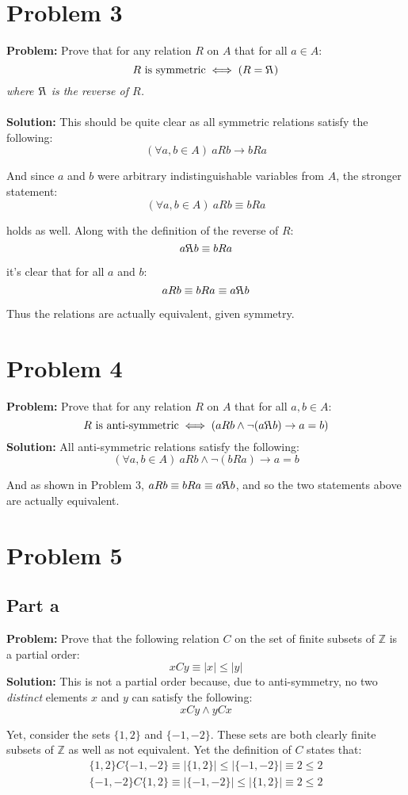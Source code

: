 \documentclass{article}
\DeclareRobustCommand{\revR}{\text{\reflectbox{$R$}}}
\begin{document}
\section*{Problem 3}
\textbf{Problem:} Prove that for any relation $R$ on $A$ that for all $a\in A$:
$$R\text{ is symmetric}\iff(R=\revR)$$
\textit{where $\revR$ is the reverse of $R$.}
\\\\
\textbf{Solution:} This should be quite clear as all symmetric relations satisfy the following:
$$(\forall a,b\in A)\ aRb\rightarrow bRa$$

And since $a$ and $b$ were arbitrary indistinguishable variables from $A$, the stronger statement:
$$(\forall a,b\in A)\ aRb\equiv bRa$$

holds as well. Along with the definition of the reverse of $R$:
$$a\revR b\equiv bRa$$

it's clear that for all $a$ and $b$:
$$aRb\equiv bRa\equiv a\revR b$$

Thus the relations are actually equivalent, given symmetry.

\section*{Problem 4}
\textbf{Problem:} Prove that for any relation $R$ on $A$ that for all $a,b\in A$:
$$R\text{ is anti-symmetric}\iff(aRb\wedge\neg(a\revR b)\rightarrow a=b)$$
\textbf{Solution:} All anti-symmetric relations satisfy the following:
$$(\forall a,b\in A)\ aRb\wedge\neg(bRa)\rightarrow a=b$$

And as shown in Problem 3, $aRb\equiv bRa\equiv a\revR b$, and so the two statements above are actually equivalent.

\section*{Problem 5}
\subsection*{Part a}
\textbf{Problem:} Prove that the following relation $C$ on the set of finite subsets of $\mathbb Z$ is a partial order:
$$xCy\equiv |x|\le|y|$$
\textbf{Solution:} This is not a partial order because, due to anti-symmetry, no two \textit{distinct} elements $x$ and $y$ can satisfy the following:
$$xCy\wedge yCx$$

Yet, consider the sets $\{1,2\}$ and $\{-1,-2\}$. These sets are both clearly finite subsets of $\mathbb Z$ as well as not equivalent. Yet the definition of $C$ states that:
\begin{gather*}
  \{1,2\}C\{-1,-2\}\equiv |\{1,2\}|\le|\{-1,-2\}|\equiv 2\le 2\\
  \{-1,-2\}C\{1,2\}\equiv |\{-1,-2\}|\le|\{1,2\}|\equiv 2\le 2
\end{gather*}
\end{document}
